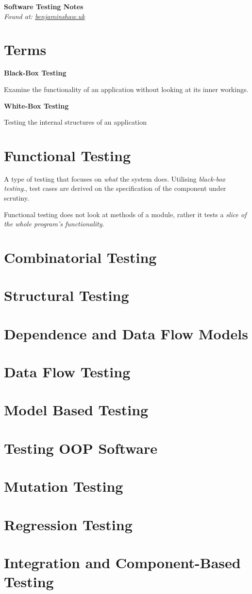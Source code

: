 \documentclass{article}
\begin{document}
\pagestyle{headings}
\textbf{\huge Software Testing Notes}\\
\textit{\footnotesize Found at: \href{http://benjaminshaw.uk}{benjaminshaw.uk}}

\section{Terms}

\textbf{Black-Box Testing}

Examine the functionality of an application without looking at its inner workings.

\textbf{White-Box Testing}

Testing the internal structures of an application

\section{Functional Testing}

A type of testing that focuses on \textit{what} the system does. Utilising \textit{black-box testing}., test cases are derived on the specification of the component under scrutiny.

Functional testing does not look at methods of a module, rather it tests a \textit{slice of the whole program's functionality.}

\section{Combinatorial Testing}

\section{Structural Testing}

\section{Dependence and Data Flow Models}

\section{Data Flow Testing}

\section{Model Based Testing}

\section{Testing OOP Software}

\section{Mutation Testing}

\section{Regression Testing}

\section{Integration and Component-Based Testing}
\end{document}
